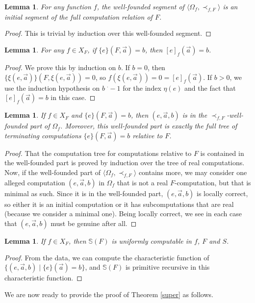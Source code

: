 \documentclass[reqno]{amsart}
\newcommand{\dminus}{\mbox{$\;^\cdot\!\!\!-$}}
\newtheorem{lem}[thm]{Lemma}
\def\SJ{\mathbb{S}}
\numberwithin{equation}{section}
\numberwithin{thm}{section}
\begin{document}
\begin{lem} \label{lemma1.6.SJ}
For any function $f$, the well-founded segment of $\langle \Omega_f , \prec_{f,F}\rangle$ is an initial segment of the full computation relation of $F$.
\end{lem} 
\begin{proof}
This is trivial by induction over this well-founded segment.
\end{proof}
\begin{lem} 
For any $f \in X_F$, if $\{e\}(F,\vec a) = b$, then $[e]_f(\vec a) = b$. 
\end{lem}
\begin{proof}
We prove this by induction on $b$. 
If $b = 0$, then $\{\xi(e,\vec a)\}(F,\xi(e, \vec a)) = 0$, so $f(\xi(e,\vec a)) = 0 = [e]_f(\vec a)$.
If $b > 0$, we use the induction hypothesis on $b \dminus 1$ for the index $\eta(e)$ and the fact that $[e]_f(\vec a) = b$ in this case.  
\end{proof}
\begin{lem} 
If $f \in X_F$ and $\{e\}(F,\vec a) = b$, then $(e,\vec a , b)$ is in the $\prec_{f,F}$-well-founded part of $\Omega_f$. Moreover, this well-founded part is exactly the full tree of terminating computations $\{e\}(F,\vec a) = b$ relative to $F$. 
\end{lem}
\begin{proof}
That the computation tree for computations relative to $F$ is contained in the well-founded part is proved by induction over the tree of real computations. 
Now, if the well-founded part of $\langle \Omega_f,\prec_{f,F}\rangle$ contains more, we may consider one alleged computation $(e,\vec a , b)$ in $\Omega_f$ that is not a real $F$-computation, but that is minimal as such. Since it is in the well-founded part, $(e,\vec a , b)$ is locally correct, so either it is an initial computation or it has subcomputations that are real (because we consider a minimal one).  Being locally correct, we see in each case that $(e,\vec a , b)$ must be genuine after all. 
\end{proof}
\begin{lem} 
If $f \in X_F$, then $\SJ(F)$ is uniformly computable in $f$, $F$ and $S$. 
\end{lem}
\begin{proof}
From the data, we can compute the characteristic function of $\{(e,\vec a , b) \mid \{e\}(\vec a) = b\}$, and $\SJ(F)$ is primitive recursive in this characteristic function. 
\end{proof}
We are now ready to provide the proof of Theorem \ref{super} as follows.  
\end{document}

